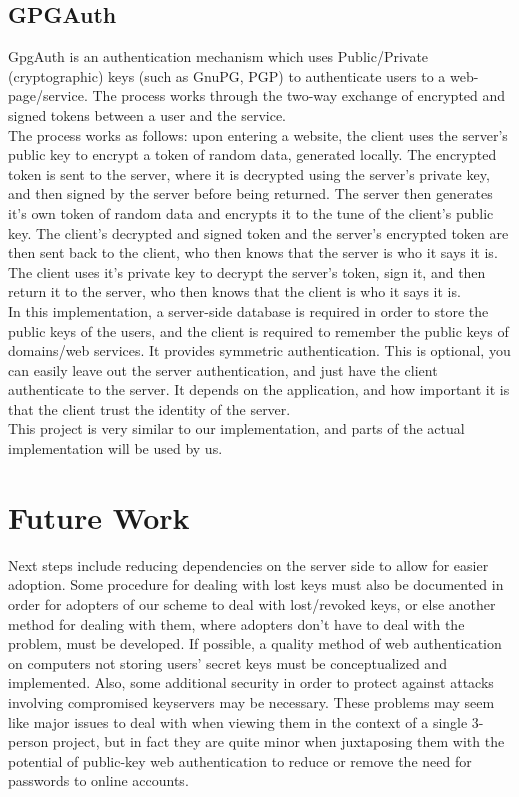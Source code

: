 \documentclass[11pt]{article}
\begin{document}
\subsection{GPGAuth} \label{subsec:gpgauth}
GpgAuth\cite{gpgauth} is an authentication mechanism which uses Public/Private (cryptographic) keys (such as GnuPG, PGP) to authenticate users to a web-page/service.  The process works through the two-way exchange of encrypted and signed tokens between a user and the service.\\
	The process works as follows: upon entering a website, the client uses the server's public key to encrypt a token of random data, generated locally.  The encrypted token is sent to the server, where it is decrypted using the server's private key, and then signed by the server before being returned.  The server then generates it's own token of random data and encrypts it to the tune of the client's public key.  The client's decrypted and signed token  and the server's encrypted token are then sent back to the client, who then knows that the server is who it says it is.  The client uses it's private key to decrypt the server's token, sign it, and then return it to the server, who then knows that the client is who it says it is.\\
	In this implementation, a server-side database is required in order to store the public keys of the users, and the client is required to remember the public keys of domains/web services. It provides symmetric authentication. This is optional, you can easily leave out the server authentication, and just have the client authenticate to the server. It depends on the application, and how important it is that the client trust the identity of the server.\\
	This project is very similar to our implementation, and parts of the actual implementation will be used by us.

\section{Future Work} \label{sec:futureWork}
Next steps include reducing dependencies on the server side to allow for easier adoption.  Some procedure for dealing with lost keys must also be documented in order for adopters of our scheme to deal with lost/revoked keys, or else another method for dealing with them, where adopters don't have to deal with the problem, must be developed.  If possible, a quality method of web authentication on computers not storing users' secret keys must be conceptualized and implemented.  Also, some additional security in order to protect against attacks involving compromised keyservers may be necessary.  These problems may seem like major issues to deal with when viewing them in the context of a single 3-person project, but in fact they are quite minor when juxtaposing them with the potential of public-key web authentication to reduce or remove the need for passwords to online accounts.

\pagebreak

{}
\end{document}

